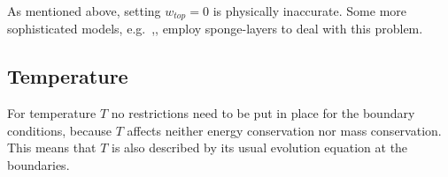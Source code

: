 As mentioned above, setting $w_{top}=0$ is physically inaccurate.
Some more sophisticated models, e.g.~\cite{kar1995formulation},\cite{baik2007effects}, employ sponge-layers to deal with this problem.

\subsection{Temperature}
For temperature $T$ no restrictions need to be put in place for the boundary conditions, because $T$ affects neither energy conservation nor mass conservation.
This means that $T$ is also described by its usual evolution equation at the boundaries.

